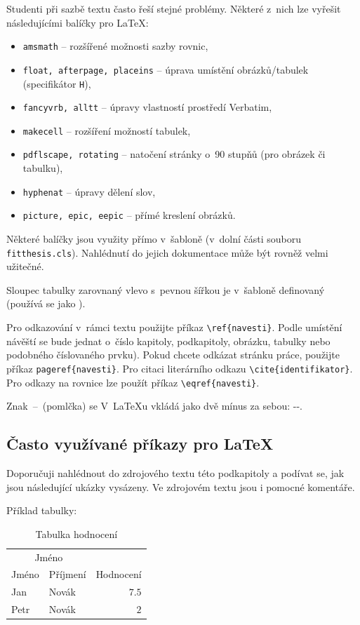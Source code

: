 Studenti při sazbě textu často řeší stejné problémy. Některé z~nich lze vyřešit následujícími balíčky pro \LaTeX:

\begin{itemize}
  \item \verb|amsmath| -- rozšířené možnosti sazby rovnic,
  \item \verb|float, afterpage, placeins| -- úprava umístění obrázků/tabulek (specifikátor \texttt{H}),
  \item \verb|fancyvrb, alltt| -- úpravy vlastností prostředí Verbatim, 
  \item \verb|makecell| -- rozšíření možností tabulek,
  \item \verb|pdflscape, rotating| -- natočení stránky o~90 stupňů (pro obrázek či tabulku),
  \item \verb|hyphenat| -- úpravy dělení slov,
  \item \verb|picture, epic, eepic| -- přímé kreslení obrázků.
\end{itemize}

Některé balíčky jsou využity přímo v~šabloně (v~dolní části souboru \texttt{fitthesis.cls}). Nahlédnutí do jejich dokumentace může být rovněž velmi užitečné.

Sloupec tabulky zarovnaný vlevo s~pevnou šířkou je v~šabloně definovaný  (používá se jako ).

Pro odkazování v~rámci textu použijte příkaz \verb|\ref{navesti}|. Podle umístění návěští se bude jednat o~číslo kapitoly, podkapitoly, obrázku, tabulky nebo podobného číslovaného prvku). Pokud chcete odkázat stránku práce, použijte příkaz \verb|pageref{navesti}|. Pro citaci literárního odkazu \verb|\cite{identifikator}|. Pro odkazy na rovnice lze použít příkaz \verb|\eqref{navesti}|.

Znak \,--\, (pomlčka) se V~\LaTeX u vkládá jako dvě mínus za sebou: -{}-.

\subsection*{Často využívané příkazy pro \LaTeX{}}
\label{sec:Fragments}

Doporučuji nahlédnout do zdrojového textu této podkapitoly a podívat se, jak jsou následující ukázky vysázeny. Ve zdrojovém textu jsou i pomocné komentáře.


Příklad tabulky:
\begin{table}[H]
	\vskip6pt
	\caption{Tabulka hodnocení} 
    \vskip6pt
	\centering
	\begin{tabular}{llr}
		\toprule
		\multicolumn{2}{c}{Jméno} \\
		\cmidrule(r){1-2}
		Jméno & Příjmení & Hodnocení \\
		\midrule
		Jan & Novák & $7.5$ \\
		Petr & Novák & $2$ \\
		\bottomrule
	\end{tabular}
	\label{tab:ExampleTable}
\end{table}

